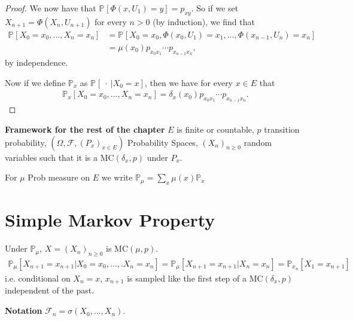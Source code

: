 \begin{proof}
{We now have that $\mathbb{P}_{} \left[\Phi(x,U_1) = y  \right] = p_{xy}$. So if we set $X_{n+1} = \Phi(X_n, U_{n+1})$ for every $n>0$ (by induction), we find that
\begin{align}
	\mathbb{P}_{} \left[ X_0=x_0, \ldots ,X_n=x_n \right] &=
		\mathbb{P}_{} \left[ X_0=x_0, \Phi(x_0, U_1)=x_1 , \ldots , \Phi(x_{n-1}, U_{n}) = x_n \right] \\
	&= \mu(x_0)p_{x_0x_1} \cdots p_{x_{n-1}x_n}
,\end{align}
by independence.

Now if we define $\mathbb{P}_{x} $ as $\mathbb{P}_{} \left[\ \cdot\ | X_0 = x \right] $, then we have for every $x \in E$ that
\begin{align}
	\mathbb{P}_{x} \left[ X_0=x_0, \ldots ,X_n=x_n \right] = \delta_x(x_0)p_{x_0x_1} \cdots p_{x_{n-1}x_n}
.\end{align}
}
\end{proof}

\noindent
\textbf{Framework for the rest of the chapter} 
$E$ is finite or countable, $p$ transition probability, $(\Omega, \mathcal{F}, (P_x)_{x \in E})$ Probability Spaces, $(X_n)_{n \geq 0}$ random variables such that it is a  $ \textrm{MC}(\delta_x, p)$ under $P_x$.

For $\mu$ Prob measure on $E $ we write $\mathbb{P}_\mu = \sum_{x}\mu(x)\mathbb{P}_{x}$

\section{Simple Markov Property}
\begin{rmk}[]
Under $\mathbb{P}_\mu$, $X=(X_n)_{n \geq 0}$ is $ \textrm{MC}(\mu, p)$.
\begin{align}
	\mathbb{P}_\mu [X_{n+1}=x_{n+1} | X_0 = x_0, \ldots ,.X_n=x_n] = \mathbb{P}_\mu[X_{n+1}=x_{n+1}| X_n = x_n] = \mathbb{P}_{x_n}[X_1 =x_{n+1}]
\end{align}
i.e. conditional on $X_n=x$, $x_{n+1}$ is sampled like the first step of a $ \textrm{MC}(\delta_{x},p)$ independent of the past.
\end{rmk}
\textbf{Notation} $ \mathcal{F}_n = \sigma(X_0, \ldots ,X_n)$.

